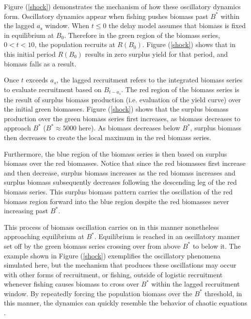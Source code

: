 %
\clearpage

%
Figure (\ref{shock}) demonstrates the mechanism of how these oscillatory
dynamics form. Oscillatory dynamics appear when fishing pushes biomass past
$B^*$ within the lagged $a_s$ window. %
When $t\le0$ the delay model assumes that biomass is fixed in equilibrium at $B_0$. 
Therefore in the green region of the biomass series, $0<t<10$, the population recruits 
at $R(B_0)$. Figure (\ref{shock}) shows that in this initial period $R(B_0)$ results in 
zero surplus yield for that period, and biomass falls as a result.

%
Once $t$ exceeds $a_s$, the lagged recruitment refers to the integrated
biomass series to evaluate recruitment based on $B_{t-a_s}$. The red
region of the biomass series is the result of surplus biomass production 
(i.e. evaluation of the yield curve) %
over the initial green biomasses. Figure (\ref{shock}) shows that the %
surplus biomass production over the green biomass series first increases, 
as biomass decreases to approach $B^*$ ($B^*\approx5000$ here). As biomass 
decreases below $B^*$, surplus biomass then decreases to create
the local maximum in the red biomass series.

%
Furthermore, the blue region of the biomass series is then based on surplus biomass %
over the red biomasses. Notice that since the red biomasses first increase and
then decrease, surplus biomass %
increases as the red biomass increases and surplus biomass subsequently decreases  %
following the descending leg of the red biomass series. This %
surplus biomass pattern carries the oscillation of the red biomass region
forward into the blue region despite the red biomasses never increasing past $B^*$. 

%
This process of biomass oscillation carries on in this manner nonetheless
approaching equilibrium at $B^*$. Equilibrium is reached in an oscillatory
manner set off by the green biomass series crossing over from above $B^*$
to below it. The example shown in Figure (\ref{shock}) exemplifies the oscillatory 
phenomena simulated here, but the mechanism that produces these oscillations may
occur with other forms of recruitment, or fishing, outside of logistic recruitment 
whenever fishing causes biomass to cross over $B^*$ within the lagged recruitment 
window. By repeatedly forcing the population biomass over the $B^*$ threshold, in 
this manner, the dynamics can quickly resemble the behavior of chaotic equations \cite{ausloos_logistic_2006, sprott_simple_2007}. %

